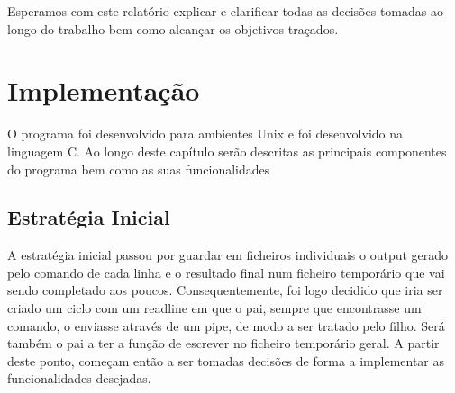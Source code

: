 \documentclass{report}
\begin{document}
\indent Esperamos com este relatório explicar e clarificar todas as decisões tomadas ao longo do trabalho bem como alcançar os objetivos traçados.

\newpage

\section{Implementação}
O programa foi desenvolvido para ambientes Unix e foi desenvolvido na linguagem C. Ao longo deste capítulo serão descritas as principais componentes do programa bem como as suas funcionalidades

\subsection{Estratégia Inicial}
A estratégia inicial passou por guardar em ficheiros individuais o output gerado pelo comando de cada linha e o resultado final num ficheiro temporário que vai sendo completado aos poucos. Consequentemente, foi logo decidido que iria ser criado um ciclo com um readline em que o pai, sempre que encontrasse um comando, o enviasse através de um pipe, de modo a ser tratado pelo filho. Será também o pai a ter a função de escrever no ficheiro temporário geral. A partir deste ponto, começam então a ser tomadas decisões de forma a implementar as funcionalidades desejadas.
\end{document}
